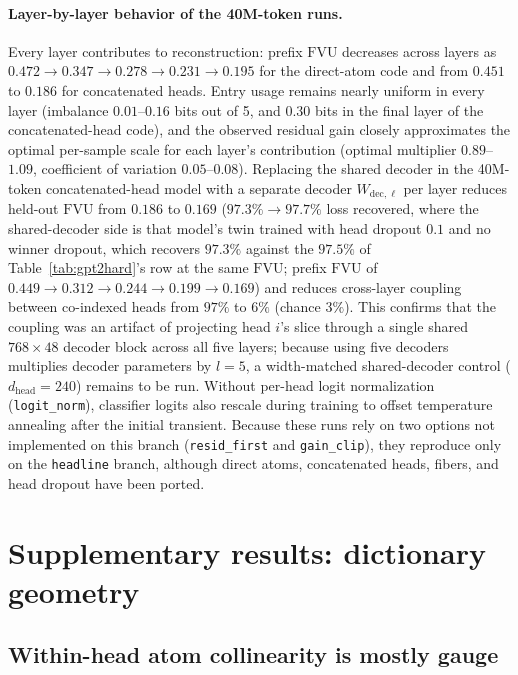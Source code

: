 \paragraph{Layer-by-layer behavior of the 40M-token runs.} Every layer
contributes to reconstruction: prefix $\mathrm{FVU}$ decreases across
layers as $0.472 \to 0.347 \to 0.278 \to 0.231 \to 0.195$ for the
direct-atom code and from $0.451$ to $0.186$ for concatenated heads. Entry
usage remains nearly uniform in every layer (imbalance $0.01$--$0.16$ bits
out of 5, and $0.30$ bits in the final layer of the concatenated-head
code), and the observed residual gain closely approximates the optimal
per-sample scale for each layer's contribution (optimal multiplier
$0.89$--$1.09$, coefficient of variation $0.05$--$0.08$). Replacing the
shared decoder in the 40M-token concatenated-head model with a separate
decoder $W_{\mathrm{dec},\ell}$ per layer reduces held-out $\mathrm{FVU}$
from $0.186$ to $0.169$ ($97.3\% \to 97.7\%$ loss recovered, where the
shared-decoder side is that model's twin trained with head dropout $0.1$
and no winner dropout, which recovers $97.3\%$ against the $97.5\%$ of
Table~\ref{tab:gpt2hard}'s row at the same $\mathrm{FVU}$; prefix
$\mathrm{FVU}$ of $0.449 \to 0.312 \to 0.244 \to 0.199 \to 0.169$) and
reduces cross-layer coupling between co-indexed heads from $97\%$ to $6\%$
(chance $3\%$). This confirms that the coupling was an artifact of
projecting head $i$'s slice through a single shared $768\times 48$ decoder
block across all five layers; because using five decoders multiplies
decoder parameters by $l{=}5$, a width-matched shared-decoder control
($d_{\mathrm{head}}{=}240$) remains to be run. Without per-head logit
normalization (\texttt{logit\_norm}), classifier logits also rescale during
training to offset temperature annealing after the initial transient.
Because these runs rely on two options not implemented on this branch
(\texttt{resid\_first} and \texttt{gain\_clip}), they reproduce only on
the \texttt{headline} branch, although direct atoms, concatenated heads,
fibers, and head dropout have been ported.

\section{Supplementary results: dictionary geometry}
\label{app:geom}

\subsection{Within-head atom collinearity is mostly gauge}
\label{sec:rowcos}

